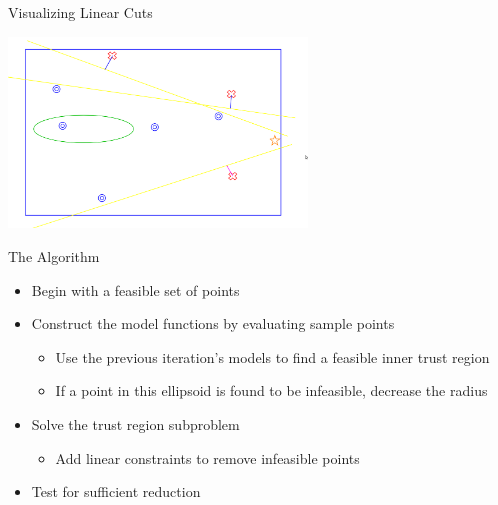\documentclass{beamer}
\begin{document}


\begin{frame}{Visualizing Linear Cuts}
\begin{center}
    \includegraphics[width=300px]{images/cut_infeasible_points.png}
\end{center}
\end{frame}



\begin{frame}{The Algorithm}
    \begin{itemize}
        \item Begin with a feasible set of points
        \item Construct the model functions by evaluating sample points
            \begin{itemize}
                \item Use the previous iteration's models to find a feasible inner trust region
                \item If a point in this ellipsoid is found to be infeasible, decrease the radius
            \end{itemize}
        \item Solve the trust region subproblem
            \begin{itemize}
                \item Add linear constraints to remove infeasible points
            \end{itemize}
        \item Test for sufficient reduction
    \end{itemize}
\end{frame}
\end{document}
